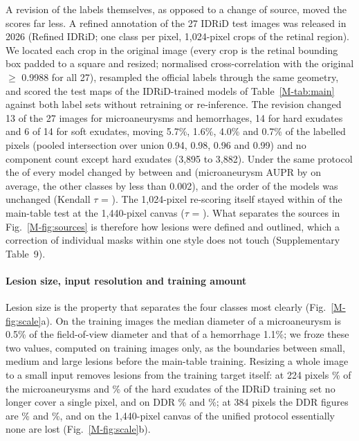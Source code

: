 A revision of the labels themselves, as opposed to a change of source, moved the scores far less. A refined annotation of the 27 IDRiD test images was released in 2026 (Refined IDRiD; one class per pixel, 1,024-pixel crops of the retinal region). We located each crop in the original image (every crop is the retinal bounding box padded to a square and resized; normalised cross-correlation with the original $\geq$ 0.9988 for all 27), resampled the official labels through the same geometry, and scored the test maps of the  IDRiD-trained models of Table~\ref{M-tab:main} against both label sets without retraining or re-inference. The revision changed 13 of the 27 images for microaneurysms and hemorrhages, 14 for hard exudates and 6 of 14 for soft exudates, moving 5.7\%, 1.6\%, 4.0\% and 0.7\% of the labelled pixels (pooled intersection over union 0.94, 0.98, 0.96 and 0.99) and no component count except hard exudates (3,895 to 3,882). Under the same protocol the \mAUPR{} of every model changed by between  and  (microaneurysm AUPR by  on average, the other classes by less than 0.002), and the order of the  models was unchanged (Kendall $\tau$ = ). The 1,024-pixel re-scoring itself stayed within  \mAUPR{} of the main-table test at the 1,440-pixel canvas ($\tau$ = ). What separates the sources in Fig.~\ref{M-fig:sources} is therefore how lesions were defined and outlined, which a correction of individual masks within one style does not touch (Supplementary Table~9).

\paragraph{Lesion size, input resolution and training amount}

Lesion size is the property that separates the four classes most clearly (Fig.~\ref{M-fig:scale}a). On the training images the median diameter of a microaneurysm is 0.5\% of the field-of-view diameter and that of a hemorrhage 1.1\%; we froze these two values, computed on training images only, as the boundaries between small, medium and large lesions before the main-table training. Resizing a whole image to a small input removes lesions from the training target itself: at 224 pixels \% of the microaneurysms and \% of the hard exudates of the IDRiD training set no longer cover a single pixel, and on DDR \% and \%; at 384 pixels the DDR figures are \% and \%, and on the 1,440-pixel canvas of the unified protocol essentially none are lost (Fig.~\ref{M-fig:scale}b).

